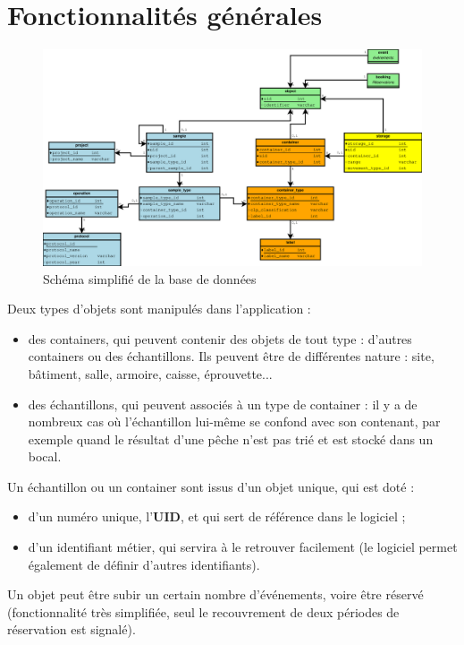 \section{Fonctionnalités générales}

\begin{figure}[H]
\includegraphics[width=\linewidth]{images/db_schema_simplifie}
\caption{Schéma simplifié de la base de données}
\end{figure}

Deux types d'objets sont manipulés dans l'application :
\begin{itemize}
\item des containers, qui peuvent contenir des objets de tout type : d'autres containers ou des échantillons. Ils peuvent être de différentes nature : site, bâtiment, salle, armoire, caisse, éprouvette...
\item des échantillons, qui peuvent associés à un type de container : il y a de nombreux cas où l'échantillon lui-même se confond avec son contenant, par exemple quand le résultat d'une pêche n'est pas trié et est stocké dans un bocal.
\end{itemize}

Un échantillon ou un container sont issus d'un objet unique, qui est doté :
\begin{itemize}
\item d'un numéro unique, l'\textbf{UID}, et qui sert de référence dans le logiciel ;
\item d'un identifiant métier, qui servira à le retrouver facilement (le logiciel permet également de définir d'autres identifiants).
\end{itemize}

Un objet peut être subir un certain nombre d'événements, voire être réservé (fonctionnalité très simplifiée, seul le recouvrement de deux périodes de réservation est signalé).

